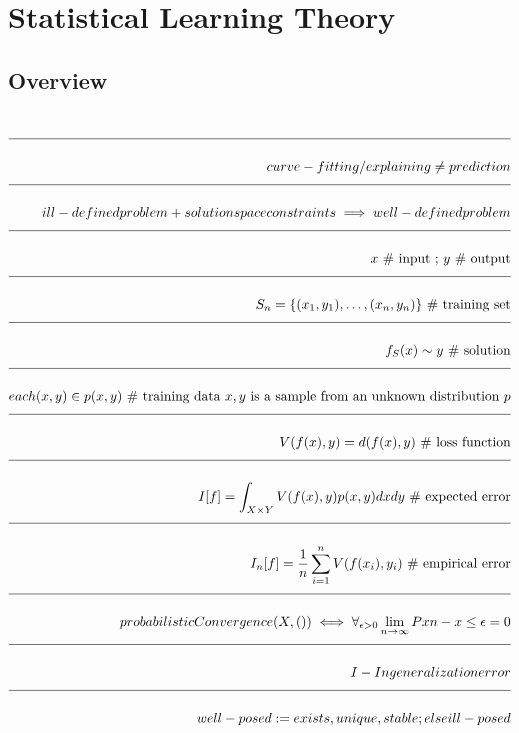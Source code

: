 \documentclass[a4paper]{article}
\newcommand{\eqComment}[1]{\text{  \# #1}}
\newcommand{\eqSep}{\text{ ;  }}
\newcommand{\n}{\\[1.5ex] \hline \nonumber \\[0ex]}
\begin{document}
\section{Statistical Learning Theory}
\subsection{Overview}
\begin{tcolorbox}
\begin{align}
\n curve-fitting / explaining \neq prediction
\n ill-defined problem + solution space constraints \implies well-defined problem
\n x \eqComment{input} \eqSep y \eqComment{output}
\n S_n = \{(x_1, y_1), \ldots, (x_n, y_n)\} \eqComment{training set}
\n f_S(x) \sim y \eqComment{solution}
\n each (x,y) \in p(x, y) \eqComment{training data $x, y$ is a sample from an unknown distribution $p$}
\n V(f(x), y) = d(f(x), y) \eqComment{loss function}
\n I[f] = \int_{X \times Y}{V(f(x), y) p(x, y) dx dy} \eqComment{expected error}
\n I_n[f] = \frac{1}{n} \sum_{i=1}^{n}{V(f(x_i), y_i)} \eqComment{empirical error}
\n probabilisticConvergence(X, ()) \iff \forall_{\epsilon > 0} \lim_{n \to \infty}{P{xn - x} \leq \epsilon} = 0
\n I - In generalization error
\n well-posed := exists, unique, stable ; else ill-posed
\end {align}
\end{tcolorbox}
\end{document}
